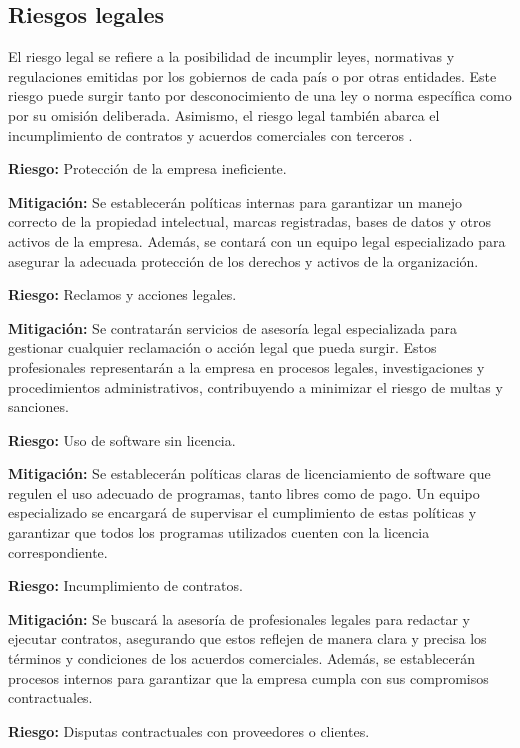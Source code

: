 
\color{red}
\subsection{Riesgos legales}

El riesgo legal se refiere a la posibilidad de incumplir leyes, normativas y regulaciones emitidas por los gobiernos de cada país o por otras entidades. Este riesgo puede surgir tanto por desconocimiento de una ley o norma específica como por su omisión deliberada. Asimismo, el riesgo legal también abarca el incumplimiento de contratos y acuerdos comerciales con terceros \cite{pira}.

\textbf{Riesgo:} Protección de la empresa ineficiente.

\textbf{Mitigación:} Se establecerán políticas internas para garantizar un manejo correcto de la propiedad intelectual, marcas registradas, bases de datos y otros activos de la empresa. Además, se contará con un equipo legal especializado para asegurar la adecuada protección de los derechos y activos de la organización.

\textbf{Riesgo:} Reclamos y acciones legales.

\textbf{Mitigación:} Se contratarán servicios de asesoría legal especializada para gestionar cualquier reclamación o acción legal que pueda surgir. Estos profesionales representarán a la empresa en procesos legales, investigaciones y procedimientos administrativos, contribuyendo a minimizar el riesgo de multas y sanciones.

\textbf{Riesgo:} Uso de software sin licencia.


\textbf{Mitigación:} Se establecerán políticas claras de licenciamiento de software que regulen el uso adecuado de programas, tanto libres como de pago. Un equipo especializado se encargará de supervisar el cumplimiento de estas políticas y garantizar que todos los programas utilizados cuenten con la licencia correspondiente.

\textbf{Riesgo:} Incumplimiento de contratos.


\textbf{Mitigación:} Se buscará la asesoría de profesionales legales para redactar y ejecutar contratos, asegurando que estos reflejen de manera clara y precisa los términos y condiciones de los acuerdos comerciales. Además, se establecerán procesos internos para garantizar que la empresa cumpla con sus compromisos contractuales.

\textbf{Riesgo:} Disputas contractuales con proveedores o clientes.


